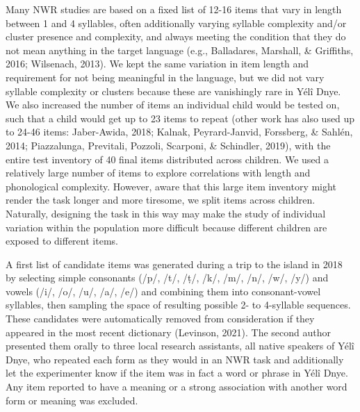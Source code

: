 \documentclass[
  english,
  ,man,floatsintext]{apa6}
\begin{document}
Many NWR studies are based on a fixed list of 12-16 items that vary in length between 1 and 4 syllables, often additionally varying syllable complexity and/or cluster presence and complexity, and always meeting the condition that they do not mean anything in the target language (e.g., Balladares, Marshall, \& Griffiths, 2016; Wilsenach, 2013). We kept the same variation in item length and requirement for not being meaningful in the language, but we did not vary syllable complexity or clusters because these are vanishingly rare in Yélî Dnye. We also increased the number of items an individual child would be tested on, such that a child would get up to 23 items to repeat (other work has also used up to 24-46 items: Jaber-Awida, 2018; Kalnak, Peyrard-Janvid, Forssberg, \& Sahlén, 2014; Piazzalunga, Previtali, Pozzoli, Scarponi, \& Schindler, 2019), with the entire test inventory of 40 final items distributed across children. We used a relatively large number of items to explore correlations with length and phonological complexity. However, aware that this large item inventory might render the task longer and more tiresome, we split items across children. Naturally, designing the task in this way may make the study of individual variation within the population more difficult because different children are exposed to different items.

A first list of candidate items was generated during a trip to the island in 2018 by selecting simple consonants (/p/, /t/, /ṭ/, /k/, /m/, /n/, /w/, /y/) and vowels (/i/, /o/, /u/, /a/, /e/) and combining them into consonant-vowel syllables, then sampling the space of resulting possible 2- to 4-syllable sequences. These candidates were automatically removed from consideration if they appeared in the most recent dictionary (Levinson, 2021). The second author presented them orally to three local research assistants, all native speakers of Yélî Dnye, who repeated each form as they would in an NWR task and additionally let the experimenter know if the item was in fact a word or phrase in Yélî Dnye. Any item reported to have a meaning or a strong association with another word form or meaning was excluded.
\end{document}
